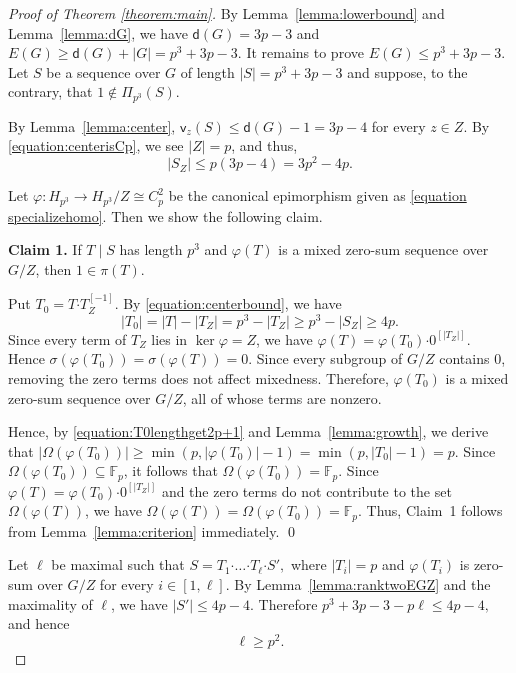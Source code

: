 \documentclass[a4paper, 12pt]{article}
\theoremstyle{definition}
\begin{document}
\begin{proof}[Proof of Theorem \ref{theorem:main}]
By Lemma~\ref{lemma:lowerbound} and Lemma~\ref{lemma:dG}, we have $\mathsf d(G)=3p-3$ and
$E(G)\ge \mathsf d(G)+|G|=p^3+3p-3$.
It remains to prove $E(G)\leq p^3+3p-3$. Let $S$ be a sequence over
$G$ of length
$|S|=p^3+3p-3$
and suppose, to the contrary, that
$1\notin\Pi_{p^3}(S)$.

By Lemma~\ref{lemma:center},
$\mathsf v_z(S)\leq \mathsf d(G)-1=3p-4$ for every $z\in Z$. By \eqref{equation:centerisCp}, we see $|Z|=p$, and thus,
\begin{equation}\label{equation:centerbound}
|S_Z|\le p(3p-4)=3p^2-4p.
\end{equation}

Let
$\varphi:H_{p^3}\longrightarrow H_{p^3}/Z\cong C_p^2$
be the canonical epimorphism given as \eqref{equation specializehomo}. Then we show the following claim.



\medskip
\noindent\textbf{Claim 1.}
If $T\mid S$ has length $p^3$ and $\varphi(T)$ is a mixed zero-sum
sequence over $G/Z$, then
$1\in\pi(T)$.

 \smallskip

Put
$T_0=T\boldsymbol{\cdot}T_Z^{[-1]}$.
By \eqref{equation:centerbound}, we have
\begin{equation}\label{equation:T0lengthget2p+1}
|T_0|=|T|-|T_Z|=p^3-|T_Z|\ge p^3-|S_Z| \ge 4p.
\end{equation}
 Since every term of $T_Z$ lies in $\ker\varphi=Z$, we have
$\varphi(T)=\varphi(T_0)\boldsymbol{\cdot}0^{[|T_Z|]}.$
Hence $\sigma(\varphi(T_0))=\sigma(\varphi(T))=0$. Since every subgroup of $G/Z$ contains $0$, removing the zero terms
does not affect mixedness.
Therefore, $\varphi(T_0)$ is a mixed
zero-sum sequence over $G/Z$, all of whose terms are nonzero.


Hence, by \eqref{equation:T0lengthget2p+1} and Lemma~\ref{lemma:growth}, we derive that
$|\Omega(\varphi(T_0))|\ge  \min(p,|\varphi(T_0)|-1)=\min(p,|T_0|-1)=p$. Since $\Omega(\varphi(T_0))\subseteq\mathbb F_p$, it follows that
$\Omega(\varphi(T_0))=\mathbb F_p$.
Since
$\varphi(T)=\varphi(T_0)\boldsymbol{\cdot}0^{[|T_Z|]}$ and
the zero terms do not contribute to the set $\Omega(\varphi(T))$, we have
$\Omega(\varphi(T))=
\Omega(\varphi(T_0))=
\mathbb F_p.$
Thus, Claim~1 follows from  Lemma~\ref{lemma:criterion} immediately. \qed


\medskip
Let $\ell$ be maximal such that
$S=T_1\boldsymbol{\cdot}\ldots\boldsymbol{\cdot}T_\ell \boldsymbol{\cdot}S',$
where
$|T_i|=p$
and $\varphi(T_i)$ is zero-sum over $G/Z$ for every $i\in[1,\ell]$.
By Lemma~\ref{lemma:ranktwoEGZ} and the  maximality of $\ell$, we have
$|S'|\le4p-4$.
Therefore
$p^3+3p-3-p\ell\le4p-4,$
and hence
\begin{equation}\label{equation:ell}
\ell\ge p^2.
\end{equation}


\end{proof}
\end{document}
